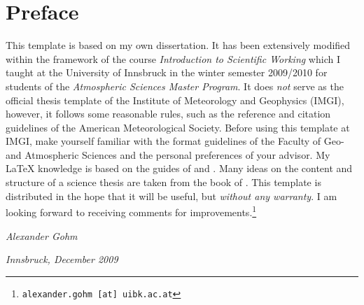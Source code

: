 \chapter*{Preface}
\thispagestyle{plain}

This \LaTeXe{} template is based on my own dissertation. It has been extensively
modified within the framework of the course \emph{Introduction to Scientific
Working} which I taught at the University of Innsbruck in the winter semester
2009/2010 for students of the \emph{Atmospheric Sciences Master Program}. It
does \emph{not} serve as the official thesis template of the Institute of
Meteorology and Geophysics (IMGI), however, it follows some reasonable rules,
such as the reference and citation guidelines of the American Meteorological
Society. Before using this template at IMGI, make yourself familiar with the
format guidelines of the Faculty of Geo- and Atmospheric Sciences and
the personal preferences of your advisor. My \LaTeX{} knowledge is based on the
guides of \citet{oeti08Aag} and \citet{kopk99Aag}. Many ideas on the content and
structure of a science thesis are taken from the book of \citet{russ06Aag}. This
template is distributed in the hope that it will be useful, but \emph{without
any warranty}. I am looking forward to receiving comments for
improvements.\footnote{\texttt{alexander.gohm [at] uibk.ac.at}}

\begin{flushright}
\textit{Alexander Gohm}

\textit{Innsbruck, December 2009} 
\end{flushright}
